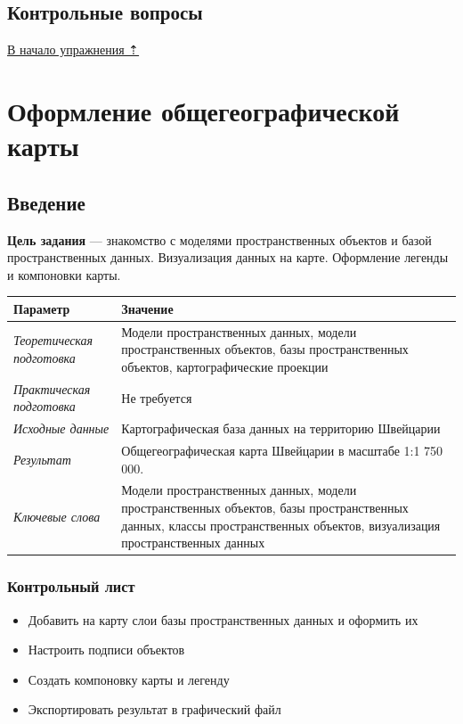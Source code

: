 \documentclass[]{book}
\providecommand{\tightlist}{%
  \setlength{\itemsep}{0pt}\setlength{\parskip}{0pt}}
\theoremstyle{definition}
\theoremstyle{definition}
\theoremstyle{definition}
\theoremstyle{remark}
\begin{document}
\hypertarget{map-design-quaternary-questions}{%
\section{Контрольные вопросы}\label{map-design-quaternary-questions}}

\protect\hyperlink{map-design-quaternary}{В начало упражнения ⇡}

\hypertarget{map-design-general}{%
\chapter{Оформление общегеографической карты}\label{map-design-general}}

\hypertarget{map-design-general-intro}{%
\section{Введение}\label{map-design-general-intro}}

\textbf{Цель задания} --- знакомство с моделями пространственных
объектов и базой пространственных данных. Визуализация данных на карте.
Оформление легенды и компоновки карты.

\begin{longtable}[]{@{}ll@{}}
\toprule
Параметр & Значение\tabularnewline
\midrule
\endhead
\emph{Теоретическая подготовка} & Модели пространственных данных, модели
пространственных объектов, базы пространственных объектов,
картографические проекции\tabularnewline
\emph{Практическая подготовка} & Не требуется\tabularnewline
\emph{Исходные данные} & Картографическая база данных на территорию
Швейцарии\tabularnewline
\emph{Результат} & Общегеографическая карта Швейцарии в масштабе 1:1 750
000.\tabularnewline
\emph{Ключевые слова} & Модели пространственных данных, модели
пространственных объектов, базы пространственных данных, классы
пространственных объектов, визуализация пространственных
данных\tabularnewline
\bottomrule
\end{longtable}

\hypertarget{map-design-general-control}{%
\subsection{Контрольный лист}\label{map-design-general-control}}

\begin{itemize}
\tightlist
\item
  Добавить на карту слои базы пространственных данных и оформить их
\item
  Настроить подписи объектов
\item
  Создать компоновку карты и легенду
\item
  Экспортировать результат в графический файл
\end{itemize}
\end{document}
